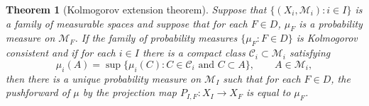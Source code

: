 \documentclass{article}
\newtheorem{theorem}{Theorem}
\theoremstyle{definition}
\begin{document}
\begin{theorem}[Kolmogorov extension theorem]
Suppose that $\{(X_i,\mathscr{M}_i): i \in I\}$ is a family of measurable spaces
and suppose that for each $F \in D$, $\mu_F$ is a probability measure
on $\mathscr{M}_F$. If the family of probability measures $\{\mu_F: F \in D\}$
is Kolmogorov consistent and if for each $i \in I$ there is a compact class $\mathscr{C}_i \subset
\mathscr{M}_i$ satisfying
\begin{equation}
\mu_i (A) = \sup\{\mu_i(C) : \textrm{$C \in \mathscr{C}_i$ and $C \subset A$}\}, \qquad A \in \mathscr{M}_i,
\label{compacthypothesis}
\end{equation}
then there is a unique probability measure on $\mathscr{M}_I$ such that for
each $F \in D$, the pushforward of $\mu$ by the projection map $P_{I,F}:X_I \to X_F$ is equal to $\mu_F$. 
\label{kolmogorovtheorem}
\end{theorem}
\end{document}
